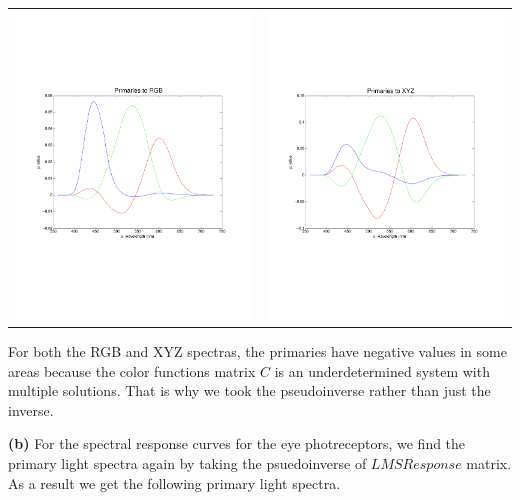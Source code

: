 \documentclass[12pt,twoside]{article}
\newcommand{\tabUnit}{3ex}
\newcommand{\tabT}{\hspace*{\tabUnit}}
\begin{document}
\begin{tabular}{ c c }
 \includegraphics[width = 200pt, trim = 50pt 50pt 50pt 50pt, clip]{P_RGB} 
 & \includegraphics[width = 200pt, trim = 50pt 50pt 50pt 50pt, clip]{P_XYZ} \\
\end{tabular}

For both the RGB and XYZ spectras, the primaries have negative values in some areas because the color functions matrix $C$ is an underdetermined system with multiple solutions.  That is why we took the pseudoinverse rather than just the inverse.
\newline

\tabT \textbf{(b)} For the spectral response curves for the eye photreceptors, we find the primary light spectra again by taking the psuedoinverse of $LMSResponse$ matrix.  As a result we get the following primary light spectra.
\newline
\end{document}
